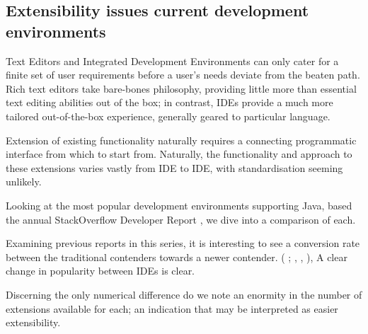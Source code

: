 \subsection{Extensibility issues current development environments}

Text Editors and Integrated Development Environments can only cater for a finite set of user requirements before a user's needs deviate from the beaten path. Rich text editors take bare-bones philosophy, providing little more than essential text editing abilities out of the box; in contrast, IDEs provide a much more tailored out-of-the-box experience, generally geared to particular language. 

Extension of existing functionality naturally requires a connecting programmatic interface from which to start from. Naturally, the functionality and approach to these extensions varies vastly from IDE to IDE, with standardisation seeming unlikely. 

Looking at the most popular development environments supporting Java, based the annual StackOverflow Developer Report \parencite{stackOverflowDevReport2019}, we dive into a comparison of each.

Examining previous reports in this series, it is interesting to see a conversion rate between the traditional contenders towards a newer contender. (\citeauthor{stackOverflowDevReport2018} ; , , ), A clear change in popularity between IDEs is clear. 

Discerning the only numerical difference do we note an enormity in the number of extensions available for each; an indication that may be interpreted as easier extensibility.










